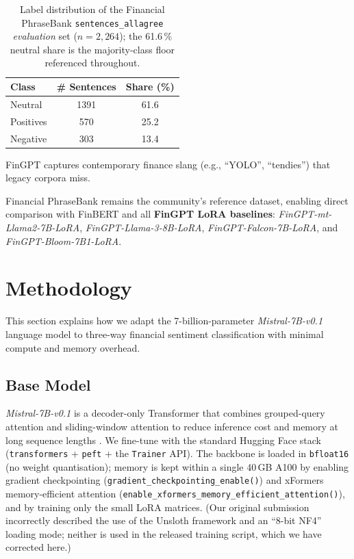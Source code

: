 \documentclass[a4paper]{article}
\begin{document}
\begin{table}[htbp]
\centering
\caption{Label distribution of the Financial PhraseBank \texttt{sentences\_allagree} \emph{evaluation} set ($n = 2{,}264$); the 61.6\,\% neutral share is the majority-class floor referenced throughout.}
\label{tab:label-dist}
\begin{tabular}{lcc}
\toprule
\textbf{Class} & \textbf{\# Sentences} & \textbf{Share (\%)} \\
\midrule
Neutral   & 1391 & 61.6 \\
Positives & 570  & 25.2 \\
Negative  & 303  & 13.4 \\
\bottomrule
\end{tabular}
\end{table}

FinGPT captures contemporary finance slang (e.g., ``YOLO'', ``tendies'') that legacy corpora miss.

Financial PhraseBank \cite{malo2014} remains the community's reference dataset, enabling direct comparison with FinBERT and all \textbf{FinGPT LoRA baselines}: \textit{FinGPT-mt-Llama2-7B-LoRA}, \textit{FinGPT-Llama-3-8B-LoRA}, \textit{FinGPT-Falcon-7B-LoRA}, and \textit{FinGPT-Bloom-7B1-LoRA}.


\section{Methodology}

This section explains how we adapt the 7-billion-parameter \textit{Mistral-7B-v0.1} language model to three-way financial sentiment classification with minimal compute and memory overhead.

\subsection{Base Model}

\textit{Mistral-7B-v0.1} is a decoder-only Transformer that combines grouped-query attention and sliding-window attention to reduce inference cost and memory at long sequence lengths \cite{mistral2023}. We fine-tune with the standard Hugging Face stack (\texttt{transformers} + \texttt{peft} + the \texttt{Trainer} API). The backbone is loaded in \texttt{bfloat16} (no weight quantisation); memory is kept within a single 40\,GB A100 by enabling gradient checkpointing (\texttt{gradient\_checkpointing\_enable()}) and xFormers memory-efficient attention (\texttt{enable\_xformers\_memory\_efficient\_attention()}), and by training only the small LoRA matrices. (Our original submission incorrectly described the use of the Unsloth framework and an ``8-bit NF4'' loading mode; neither is used in the released training script, which we have corrected here.)
\end{document}
